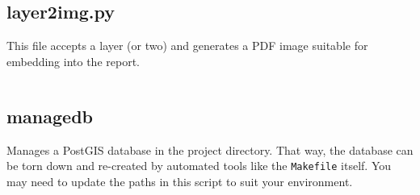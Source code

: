 \documentclass[a4paper]{article}
\begin{document}
\begin{appendices}
\subsection{layer2img.py}
This file accepts a layer (or two) and generates a PDF image suitable for embedding into the report.
\inputminted[fontsize=\small]{python}{layer2img.py}

\subsection{managedb}
Manages a PostGIS database in the project directory. That way, the database can
be torn down and re-created by automated tools like the {\tt Makefile} itself.
You may need to update the paths in this script to suit your environment.
\inputminted[fontsize=\small]{bash}{managedb}

\end{appendices}
\end{document}
